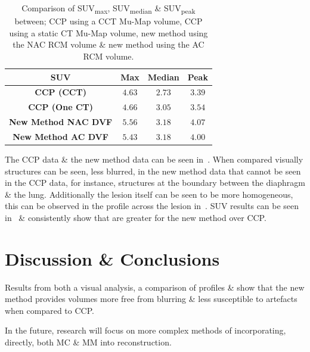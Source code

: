     \begin{table}
        \centering
        \captionsetup{singlelinecheck=false, justification=centering}
        \caption{Comparison of \gls{SUV}\textsubscript{max}, \gls{SUV}\textsubscript{median} \& \gls{SUV}\textsubscript{peak} between; \gls{CCP} using a \gls{CCT} \gls{Mu-Map} volume, \gls{CCP} using a static \gls{CT} \gls{Mu-Map} volume, new method using the \gls{NAC} \gls{RCM} volume \& new method using the \gls{AC} \gls{RCM} volume.}
        
        \resizebox*{0.75\linewidth}{!}
        {
            \begin{tabular}{||c|ccc||}
                \hline
                \textbf{\gls{SUV}} & \textbf{Max} & \textbf{Median} & \textbf{Peak} \\
                \hline
                \textbf{\gls{CCP} (\gls{CCT})}          & $4.63$ & $2.73$ & $3.39$ \\
                \textbf{\gls{CCP} (One \gls{CT})}       & $4.66$ & $3.05$ & $3.54$ \\
                \hline
                \textbf{New Method \gls{NAC} \gls{DVF}} & $5.56$ & $3.18$ & $4.07$ \\
                \textbf{New Method \gls{AC} \gls{DVF}}  & $5.43$ & $3.18$ & $4.00$ \\
                \hline
            \end{tabular}
        }
        \label{tab:suv}
    \end{table}
    
     The \gls{CCP} data \& the new method data can be seen in~. When compared visually structures can be seen, less blurred, in the new method data that cannot be seen in the \gls{CCP} data, for instance, structures at the boundary between the diaphragm \& the lung. Additionally the lesion itself can be seen to be more homogeneous, this can be observed in the profile across the lesion in~. \gls{SUV} results can be seen in~ \& consistently show that  are greater for the new method over \gls{CCP}.

\section{Discussion \& Conclusions} \label{sec:discussion_and_conclusions}
    Results from both a visual analysis, a comparison of profiles \&  show that the new method provides volumes more free from blurring \& less susceptible to artefacts when compared to \gls{CCP}.
    
    In the future, research will focus on more complex methods of incorporating, directly, both \gls{MC}  \& \gls{MM} into reconstruction.
    